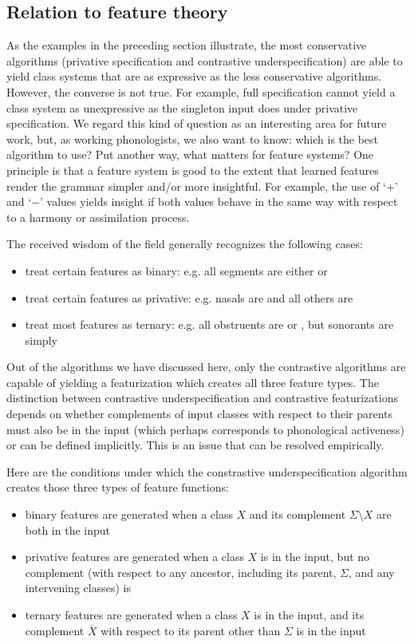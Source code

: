 \documentclass[11pt, oneside]{article}   	%
\begin{document}
\subsection{Relation to feature theory}

As the examples in the preceding section illustrate, the most conservative algorithms (privative specification and contrastive underspecification) are able to yield class systems that are as expressive as the less conservative algorithms. However, the converse is not true. For example, full specification cannot yield a class system as unexpressive as the singleton input does under privative specification. We regard this kind of question as an interesting area for future work, but, as working phonologists, we also want to know: which is the best algorithm to use? Put another way, what matters for feature systems? One principle is that a feature system is good to the extent that learned features render the grammar simpler and/or more insightful. For example, the use of `$+$' and `$-$' values yields insight if both values behave in the same way with respect to a harmony or assimilation process.

The received wisdom of the field generally recognizes the following cases: \begin{itemize}
    \item treat certain features as binary: e.g. all segments are either  or 
    \item treat certain features as privative: e.g. nasals are  and all others are 
    \item treat most features as ternary: e.g. all obstruents are  or , but sonorants are simply 
    \end{itemize}
Out of the algorithms we have discussed here, only the contrastive algorithms are capable of yielding a featurization which creates all three feature types. The distinction between contrastive underspecification and contrastive featurizations depends on whether complements of input classes with respect to their parents must also be in the input (which perhaps corresponds to phonological activeness) or can be defined implicitly. This is an issue that can be resolved empirically.

Here are the conditions under which the constrastive underspecification algorithm creates those three types of feature functions:
\begin{itemize}
    \item binary features are generated when a class $X$ and its complement $\Sigma \setminus X$ are both in the input
    \item privative features are generated when a class $X$ is in the input, but no complement (with respect to any ancestor, including its parent, $\Sigma$, and any intervening classes) is
    \item ternary features are generated when a class $X$ is in the input, and its complement $\overline{X}$ with respect to its parent other than $\Sigma$ is in the input
    \end{itemize}
\end{document}
